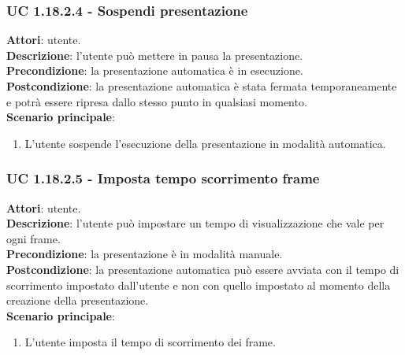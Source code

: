 	\subsubsection{UC 1.18.2.4 - Sospendi presentazione}{
		\label{uc1.18.2.4}
		\textbf{Attori}: utente. \\
		\textbf{Descrizione}: l'utente può mettere in pausa la presentazione. \\
		\textbf{Precondizione}: la presentazione automatica è in esecuzione.	\\
		\textbf{Postcondizione}: la presentazione automatica è stata fermata temporaneamente e potrà essere ripresa dallo stesso punto in qualsiasi momento.\\
		\textbf{Scenario principale}:
		\begin{enumerate}
			\item L'utente sospende l'esecuzione della presentazione in modalità automatica.
		\end{enumerate}		
	}
	\subsubsection{UC 1.18.2.5 - Imposta tempo scorrimento frame}{
		\label{uc1.18.2.5}
		\textbf{Attori}: utente. \\
		\textbf{Descrizione}: l'utente può impostare un tempo di visualizzazione che vale per ogni frame. \\
		\textbf{Precondizione}: la presentazione è in modalità manuale.	\\
		\textbf{Postcondizione}: la presentazione automatica può essere avviata con il tempo di scorrimento impostato dall'utente e non con quello impostato al momento della creazione della presentazione.\\
		\textbf{Scenario principale}:
		\begin{enumerate}
			\item L'utente imposta il tempo di scorrimento dei frame.
		\end{enumerate}		
	}
